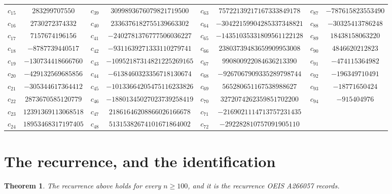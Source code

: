 \documentclass[11pt,a4paper]{article}
\theoremstyle{plain}
\newtheorem{theorem}{Theorem}
\theoremstyle{definition}
\begin{document}
\begin{center}
\begin{tabular}{cccccccc}
$c_{15}$ & $283299707550$ & $c_{39}$ & $3099893676079821719500$ & $c_{63}$ & $75722139217167333849178$ & $c_{87}$ & $-787615823553490$ \\
$c_{16}$ & $2730272374332$ & $c_{40}$ & $2336376182755139663302$ & $c_{64}$ & $-30422159904285337348821$ & $c_{88}$ & $-30325413786248$ \\
$c_{17}$ & $7157674196156$ & $c_{41}$ & $-2402781376777506036227$ & $c_{65}$ & $-14351035331809561122128$ & $c_{89}$ & $18438158063220$ \\
$c_{18}$ & $-8787739440517$ & $c_{42}$ & $-9311639271333110279741$ & $c_{66}$ & $23803739483659909953008$ & $c_{90}$ & $4846620212823$ \\
$c_{19}$ & $-130734418666760$ & $c_{43}$ & $-10952187314821225269165$ & $c_{67}$ & $990800922084636213390$ & $c_{91}$ & $-474115364982$ \\
$c_{20}$ & $-429132569685856$ & $c_{44}$ & $-6138460323356718130674$ & $c_{68}$ & $-9267067909335289798744$ & $c_{92}$ & $-196349710491$ \\
$c_{21}$ & $-305344617364412$ & $c_{45}$ & $-10133664205475116233826$ & $c_{69}$ & $565280651167538988627$ & $c_{93}$ & $-18771650424$ \\
$c_{22}$ & $2873670585120779$ & $c_{46}$ & $-18801345027023739258419$ & $c_{70}$ & $3272074262359851702200$ & $c_{94}$ & $-915404976$ \\
$c_{23}$ & $12391369113068518$ & $c_{47}$ & $21861646208866026166678$ & $c_{71}$ & $-2169021114713757231435$ &  &  \\
$c_{24}$ & $18953468317197405$ & $c_{48}$ & $51315382674101671864002$ & $c_{72}$ & $-292282810757091905110$ &  &  \\
\end{tabular}
\end{center}

\section{The recurrence, and the identification}

\begin{theorem}
The recurrence above holds for every $n\ge100$, and it is the recurrence OEIS A266057 records.
\end{theorem}
\end{document}
